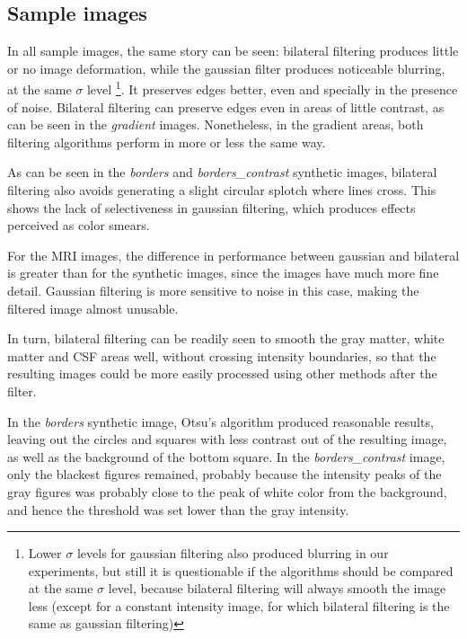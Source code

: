 

\subsection{Sample images}

In all sample images, the same story can be seen: bilateral filtering  produces little or no image deformation, while the gaussian filter produces noticeable blurring, at the same $\sigma$ level \footnote{Lower $\sigma$ levels for gaussian filtering also produced blurring in our experiments, but still it is questionable if the algorithms should be compared at the same $\sigma$ level, because bilateral filtering will always smooth the image less (except for a constant intensity image, for which bilateral filtering is the same as gaussian filtering)}. It preserves edges better, even and specially in the presence of noise. Bilateral filtering can preserve edges even in areas of little contrast, as can be seen in the \textit{gradient} images. Nonetheless, in the gradient areas, both filtering algorithms perform in more or less the same way.  

As can be seen in the \textit{borders} and \textit{borders\_contrast} synthetic images, bilateral filtering also avoids generating a slight circular splotch where lines cross. This shows the lack of selectiveness in gaussian filtering, which produces effects perceived as color smears. 

For the MRI images, the difference in performance between gaussian and bilateral is greater than for the synthetic images, since the images have much more fine detail. Gaussian filtering is more sensitive to noise in this case, making the filtered image almost unusable.

In turn, bilateral filtering can be readily seen to smooth the gray matter, white matter and CSF areas well, without crossing intensity boundaries, so that the resulting images could be more easily processed using other methods after the filter.

In the \textit{borders} synthetic image, Otsu's algorithm produced reasonable results, leaving out the circles and squares with less contrast out of the resulting image, as well as the background of the bottom square. In the \textit{borders\_contrast} image, only the blackest figures remained, probably because the intensity peaks of the gray figures was probably close to the peak of white color from the background, and hence the threshold was set lower than the gray intensity.

